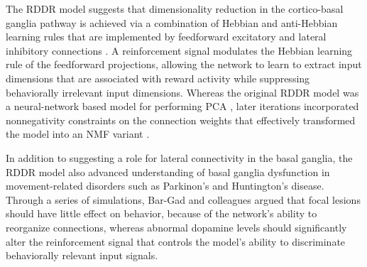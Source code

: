 The \ac{RDDR} model suggests that dimensionality reduction 
in the cortico-basal ganglia pathway is achieved via
a combination of Hebbian and anti-Hebbian learning rules
that are implemented by feedforward excitatory and lateral inhibitory
connections \cite{BarGad2000,BarGad2003_Review}.
A reinforcement signal modulates the Hebbian learning rule 
of the feedforward projections,
allowing the network to learn to extract input dimensions
that are associated with reward activity
while suppressing behaviorally irrelevant input dimensions.
Whereas the original \ac{RDDR} model was a neural-network based model
for performing \ac{PCA} \cite{BarGad2000},
later iterations incorporated nonnegativity constraints on the
connection weights that effectively transformed the model 
into an \ac{NMF} variant \cite{BarGad2003_Review}.

In addition to suggesting a role for lateral connectivity
in the basal ganglia,
the \ac{RDDR} model also advanced understanding of basal ganglia dysfunction
in movement-related disorders such as Parkinon's and Huntington's disease.
Through a series of simulations, Bar-Gad and colleagues \cite{BarGad2003_Review}
argued that focal lesions should have little effect on behavior,
because of the network's ability to reorganize connections,
whereas abnormal dopamine levels should significantly alter 
the reinforcement signal that controls the model's ability 
to discriminate behaviorally relevant input signals.


